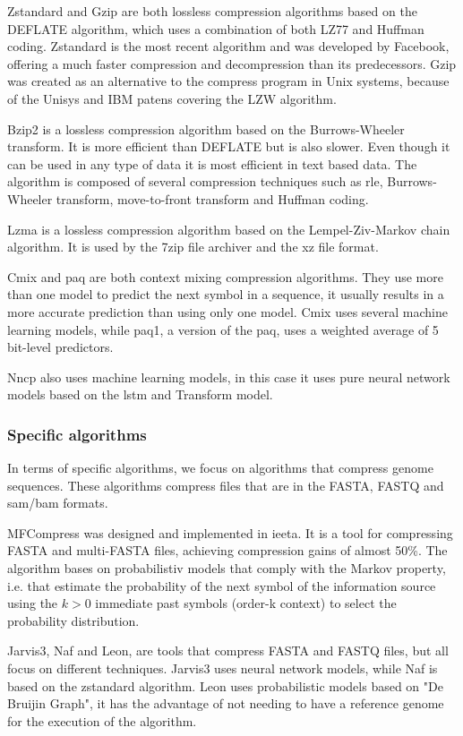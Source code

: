 Zstandard and Gzip are both lossless compression algorithms based on the DEFLATE algorithm, which uses a combination of both LZ77 and Huffman coding. Zstandard is the most recent algorithm and was developed by Facebook, offering a much faster compression and decompression than its predecessors. Gzip was created as an alternative to the compress program in Unix systems, because of the Unisys and IBM patens covering the LZW algorithm.

Bzip2 is a lossless compression algorithm based on the Burrows-Wheeler transform. It is more efficient than DEFLATE but is also slower. Even though it can be used in any type of data it is most efficient in text based data. The algorithm is composed of several compression techniques such as \ac{rle}, Burrows-Wheeler transform, move-to-front transform and Huffman coding.

Lzma is a lossless compression algorithm based on the Lempel-Ziv-Markov chain algorithm. It is used by the 7zip file archiver and the xz file format.

Cmix and paq are both context mixing compression algorithms. They use more than one model to predict the next symbol in a sequence, it usually results in a more accurate prediction than using only one model. Cmix uses several machine learning models, while paq1, a version of the paq, uses a weighted average of 5 bit-level predictors.

Nncp also uses machine learning models, in this case it uses pure neural network models based on the \ac{lstm} and Transform model.

\subsubsection{Specific algorithms}

In terms of specific algorithms, we focus on algorithms that compress genome sequences. These algorithms compress files that are in the FASTA, FASTQ and \ac{sam}/\ac{bam} formats.

MFCompress was designed and implemented in \ac{ieeta}. It is a tool for compressing FASTA and multi-FASTA files, achieving compression gains of almost 50\%. The algorithm bases on probabilistiv models that comply with the Markov property, i.e. that estimate the probability of the next symbol of the information source using the $k>0$ immediate past symbols (order-k context) to select the probability distribution. 

Jarvis3, Naf and Leon, are tools that compress FASTA and FASTQ files, but all focus on different techniques. Jarvis3 uses neural network models, while Naf is based on the zstandard algorithm. Leon uses probabilistic models based on "De Bruijin Graph", it has the advantage of not needing to have a reference genome for the execution of the algorithm.

